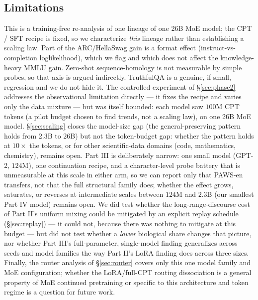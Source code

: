 \subsection{Limitations}
This is a training-free re-analysis of one lineage of one 26B MoE model; the CPT / SFT recipe is
fixed, so we characterize \emph{this} lineage rather than establishing a scaling law. Part of the
ARC/HellaSwag gain is a format effect (instruct-vs-completion loglikelihood), which we flag and
which does not affect the knowledge-heavy MMLU gain. Zero-shot sequence-homology is not
measurable by simple probes, so that axis is argued indirectly. TruthfulQA is a genuine, if
small, regression and we do not hide it. The controlled experiment of \S\ref{sec:phase2}
addresses the observational limitation directly --- it fixes the recipe and varies only the data
mixture --- but was itself bounded: each model saw $100$M CPT tokens (a pilot budget chosen to
find trends, not a scaling law), on one 26B MoE model. \S\ref{sec:scaling} closes the model-size
gap (the general-preserving pattern holds from $2.3$B to $26$B) but not the token-budget gap:
whether the pattern holds at $10\times$ the tokens, or for other scientific-data domains (code,
mathematics, chemistry), remains open. Part III is deliberately narrow: one small model
(GPT-2, $124$M), one continuation recipe, and a character-level probe battery that is
unmeasurable at this scale in either arm, so we can report only that PAWS-en transfers, not that
the full structural family does; whether the effect grows, saturates, or reverses at
intermediate scales between $124$M and $2.3$B (our smallest Part IV model) remains open. We did
test whether the long-range-discourse cost of Part II's uniform mixing could be mitigated by an
explicit replay schedule (\S\ref{sec:replay}) --- it could not, because there was nothing to
mitigate at this budget --- but did not test whether a \emph{lower} biological share changes
that picture, nor whether Part III's full-parameter, single-model finding generalizes across
seeds and model families the way Part II's LoRA finding does across three sizes. Finally, the
router analysis of \S\ref{sec:router} covers only this one model family and MoE configuration;
whether the LoRA/full-CPT routing dissociation is a general property of MoE continued
pretraining or specific to this architecture and token regime is a question for future work.
